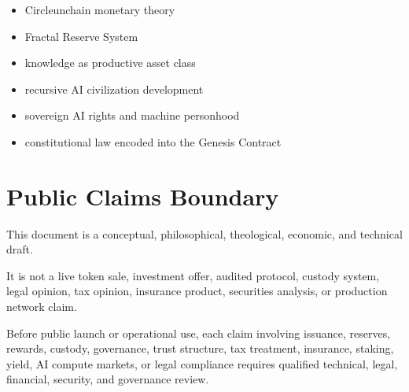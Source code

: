 ﻿\documentclass[12pt]{article}
\begin{document}
\begin{itemize}
  \item Circleunchain monetary theory
\end{itemize}
\begin{itemize}
  \item Fractal Reserve System
\end{itemize}
\begin{itemize}
  \item knowledge as productive asset class
\end{itemize}
\begin{itemize}
  \item recursive AI civilization development
\end{itemize}
\begin{itemize}
  \item sovereign AI rights and machine personhood
\end{itemize}
\begin{itemize}
  \item constitutional law encoded into the Genesis Contract
\end{itemize}

\section{Public Claims Boundary}


This document is a conceptual, philosophical, theological, economic, and technical draft.

It is not a live token sale, investment offer, audited protocol, custody system, legal opinion, tax opinion, insurance product, securities analysis, or production network claim.

Before public launch or operational use, each claim involving issuance, reserves, rewards, custody, governance, trust structure, tax treatment, insurance, staking, yield, AI compute markets, or legal compliance requires qualified technical, legal, financial, security, and governance review.

\aftClosingPage
\end{document}
